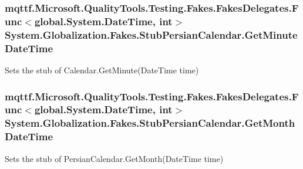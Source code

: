 \hypertarget{class_system_1_1_globalization_1_1_fakes_1_1_stub_persian_calendar_a9ccb041dc8c9aef1aef5aa4cc9334f8a}{
\subsubsection[{Get\-Minute\-Date\-Time}]{\setlength{\rightskip}{0pt plus 5cm}mqttf.\-Microsoft.\-Quality\-Tools.\-Testing.\-Fakes.\-Fakes\-Delegates.\-Func$<$global.\-System.\-Date\-Time, int$>$ System.\-Globalization.\-Fakes.\-Stub\-Persian\-Calendar.\-Get\-Minute\-Date\-Time}}\label{class_system_1_1_globalization_1_1_fakes_1_1_stub_persian_calendar_a9ccb041dc8c9aef1aef5aa4cc9334f8a}


Sets the stub of Calendar.\-Get\-Minute(\-Date\-Time time)

\hypertarget{class_system_1_1_globalization_1_1_fakes_1_1_stub_persian_calendar_aed9a849aaa3cb16f64f25a6cde1df7d2}{
\subsubsection[{Get\-Month\-Date\-Time}]{\setlength{\rightskip}{0pt plus 5cm}mqttf.\-Microsoft.\-Quality\-Tools.\-Testing.\-Fakes.\-Fakes\-Delegates.\-Func$<$global.\-System.\-Date\-Time, int$>$ System.\-Globalization.\-Fakes.\-Stub\-Persian\-Calendar.\-Get\-Month\-Date\-Time}}\label{class_system_1_1_globalization_1_1_fakes_1_1_stub_persian_calendar_aed9a849aaa3cb16f64f25a6cde1df7d2}


Sets the stub of Persian\-Calendar.\-Get\-Month(\-Date\-Time time)

